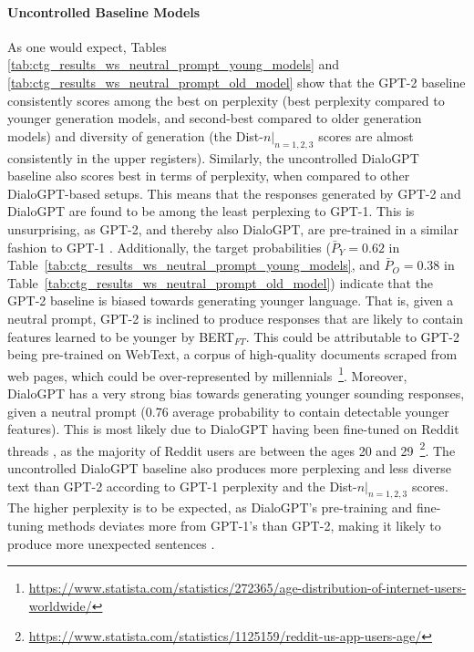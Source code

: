 \paragraph{Uncontrolled Baseline Models} As one would expect, Tables \ref{tab:ctg_results_ws_neutral_prompt_young_models} and \ref{tab:ctg_results_ws_neutral_prompt_old_model} show that the GPT-2 baseline consistently scores among the best on perplexity (best perplexity compared to younger generation models, and second-best compared to older generation models) and diversity of generation (the Dist-$n |_{n = 1,2,3}$ scores are almost consistently in the upper registers). Similarly, the uncontrolled DialoGPT baseline also scores best in terms of perplexity, when compared to other DialoGPT-based setups. This means that the responses generated by GPT-2 and DialoGPT are found to be among the least perplexing to GPT-1. This is unsurprising, as GPT-2, and thereby also DialoGPT, are pre-trained in a similar fashion to GPT-1 \citep{radford2018improving, radford2019language, zhang2019dialogpt}. Additionally, the target probabilities ($\bar{P}_Y = 0.62$ in Table~\ref{tab:ctg_results_ws_neutral_prompt_young_models}, and $\bar{P}_O = 0.38$ in Table~\ref{tab:ctg_results_ws_neutral_prompt_old_model}) indicate that the GPT-2 baseline is biased towards generating younger language. That is, given a neutral prompt, GPT-2 is inclined to produce responses that are likely to contain features learned to be younger by BERT$_{FT}$. This could be attributable to GPT-2 being pre-trained on WebText, a corpus of high-quality documents scraped from web pages, which could be over-represented by millennials~\footnote{\url{https://www.statista.com/statistics/272365/age-distribution-of-internet-users-worldwide/}}. Moreover, DialoGPT has a very strong bias towards generating younger sounding responses, given a neutral prompt (0.76 average probability to contain detectable younger features). This is most likely due to DialoGPT having been fine-tuned on Reddit threads \citep{zhang2019dialogpt}, as the majority of Reddit users are between the ages 20 and 29~\footnote{\url{https://www.statista.com/statistics/1125159/reddit-us-app-users-age/}}.
The uncontrolled DialoGPT baseline also produces more perplexing and less diverse text than GPT-2 according to GPT-1 perplexity and the Dist-$n |_{n = 1,2,3}$ scores. The higher perplexity is to be expected, as DialoGPT's pre-training and fine-tuning methods deviates more from GPT-1's than GPT-2, making it likely to produce more unexpected sentences \citep{zhang2019dialogpt}.

